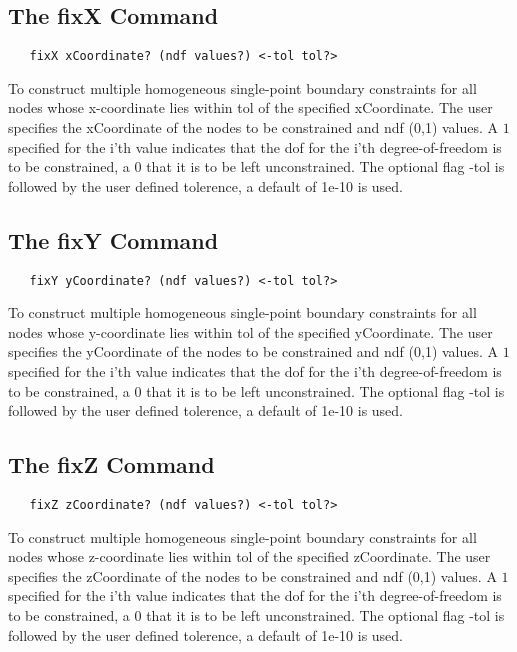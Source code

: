 \documentclass[12pt]{article}
\begin{document}
\subsection{The fixX Command}
{\sf\small
\begin{verbatim}
   fixX xCoordinate? (ndf values?) <-tol tol?>
\end{verbatim}
}

To construct multiple homogeneous single-point boundary constraints for 
all nodes whose x-coordinate lies within tol of the specified xCoordinate.
The user specifies the xCoordinate of the nodes to be constrained and ndf (0,1)
values. A $1$ specified for the i'th value indicates that the dof for
the i'th degree-of-freedom is to be constrained, a $0$ that it is to be
left unconstrained. The optional flag -tol is followed by the user defined 
tolerence, a default of 1e-10 is used.

\subsection{The fixY Command}
{\sf\small
\begin{verbatim}
   fixY yCoordinate? (ndf values?) <-tol tol?>
\end{verbatim}
}

To construct multiple homogeneous single-point boundary constraints for 
all nodes whose y-coordinate lies within tol of the specified yCoordinate.
The user specifies the yCoordinate of the nodes to be constrained and ndf (0,1)
values. A $1$ specified for the i'th value indicates that the dof for
the i'th degree-of-freedom is to be constrained, a $0$ that it is to be
left unconstrained. The optional flag -tol is followed by the user defined 
tolerence, a default of 1e-10 is used.

\subsection{The fixZ Command}
{\sf\small
\begin{verbatim}
   fixZ zCoordinate? (ndf values?) <-tol tol?>
\end{verbatim}
}

To construct multiple homogeneous single-point boundary constraints for 
all nodes whose z-coordinate lies within tol of the specified zCoordinate.
The user specifies the zCoordinate of the nodes to be constrained and ndf (0,1)
values. A $1$ specified for the i'th value indicates that the dof for
the i'th degree-of-freedom is to be constrained, a $0$ that it is to be
left unconstrained. The optional flag -tol is followed by the user defined 
tolerence, a default of 1e-10 is used.
\end{document}
